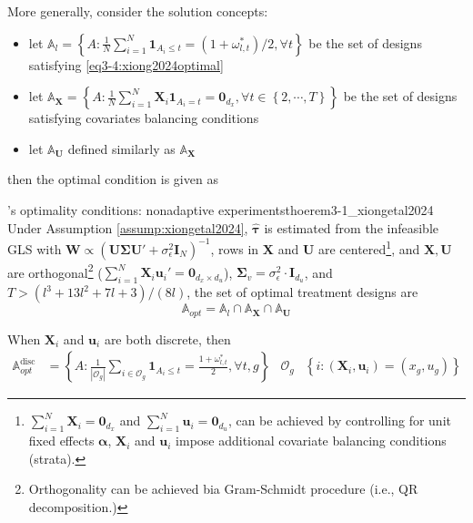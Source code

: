 \documentclass[twoside]{article}
\begin{document}
More generally, consider the solution concepts: 
\begin{itemize}
    \item let $\mathbb{A}_l = \left\{ A: \frac{1}{N}\sum^N_{i=1}\mathbf{1}_{A_i\leq t} = (1+\omega^*_{l,t})/2,\forall t \right\}$ be the set of designs satisfying \ref{eq3-4:xiong2024optimal}
    \item let $\mathbb{A}_{\mathbf{X}} = \left\{ A:\frac{1}{N}\sum^N_{i=1}\mathbf{X}_i\mathbf{1}_{A_i=t}=\mathbf{0}_{d_x},\forall t\in \left\{2,\cdots,T\right\} \right\}$ be the set of designs satisfying covariates balancing conditions 
    \item let $\mathbb{A}_{\mathbf{U}}$ defined similarly as $\mathbb{A}_{\mathbf{X}}$
\end{itemize}
then the optimal condition is given as 
\begin{theorem}{\citet{xiong2024optimal}'s optimality conditions: nonadaptive experiments}{thoerem3-1_xiongetal2024}
    Under Assumption \ref{assump:xiongetal2024}, $\hat{\boldsymbol{\tau}}$ is estimated from the infeasible GLS with $\mathbf{W} \propto \left( \mathbf{U}\boldsymbol{\Sigma}\mathbf{U}'+\sigma^2_{\epsilon}\mathbf{I}_N \right)^{-1} $, rows in $\mathbf{X}$ and $\mathbf{U}$ are centered\footnote{$\sum^N_{i=1}\mathbf{X}_i=\mathbf{0}_{d_x}$ and $\sum^N_{i=1}\mathbf{u}_i=\mathbf{0}_{d_u}$, can be achieved by controlling for unit fixed effects $\boldsymbol{\alpha}$, $\mathbf{X}_i$ and $\mathbf{u}_i$ impose additional covariate balancing conditions (strata).},
    and $\mathbf{X,U}$ are orthogonal\footnote{Orthogonality can be achieved bia Gram-Schmidt procedure (i.e., QR decomposition.)} ($\sum^N_{i=1}\mathbf{X}_i\mathbf{u}_i'=\mathbf{0}_{d_x\times d_u}$), $\boldsymbol{\Sigma}_v=\sigma^2_{\epsilon}\cdot \mathbf{I}_{d_u}$, and $T>\left(l^3+13l^2+7l+3\right)/(8l)$, the set of optimal treatment designs are $$ \mathbb{A}_{opt} = \mathbb{A}_l\cap \mathbb{A}_{\mathbf{X}}\cap \mathbb{A}_{\mathbf{U}} $$
\end{theorem}

When $\mathbf{X}_i$ and $\mathbf{u}_i$ are both discrete, then 
\begin{align*}
\mathbb{A}^{\mathrm{disc}}_{opt} &= \left\{ A:\frac{1}{\left\vert \mathcal{O}_g \right\vert } \sum_{i\in \mathcal{O}_g}\mathbf{1}_{A_i\leq t}=\frac{1+\omega^*_{l,t}}{2},\forall t,g  \right\} & \mathcal{O}_g & \left\{ i: \left(\mathbf{X}_i,\mathbf{u}_i\right) = (x_g,u_g) \right\}
\end{align*}
\end{document}
